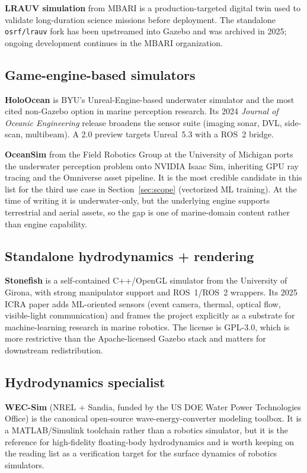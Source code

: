 \documentclass[11pt]{article}
\begin{document}
\textbf{LRAUV simulation} \autocite{player2023lrauv} from MBARI is a production-targeted digital twin used to validate long-duration science missions before deployment. The standalone \texttt{osrf/lrauv} fork has been upstreamed into Gazebo and was archived in 2025; ongoing development continues in the MBARI organization.

\subsection{Game-engine-based simulators}
\label{sec:game-engine}

\textbf{HoloOcean} \autocite{potokar2022holoocean,potokar2024holoocean} is BYU's Unreal-Engine-based underwater simulator and the most cited non-Gazebo option in marine perception research. Its 2024 \emph{Journal of Oceanic Engineering} release broadens the sensor suite (imaging sonar, DVL, side-scan, multibeam). A 2.0 preview targets Unreal~5.3 with a ROS~2 bridge.

\textbf{OceanSim} \autocite{song2025oceansim} from the Field Robotics Group at the University of Michigan ports the underwater perception problem onto NVIDIA Isaac Sim, inheriting GPU ray tracing and the Omniverse asset pipeline. It is the most credible candidate in this list for the third use case in Section~\ref{sec:scope} (vectorized ML training). At the time of writing it is underwater-only, but the underlying engine supports terrestrial and aerial assets, so the gap is one of marine-domain content rather than engine capability.

\subsection{Standalone hydrodynamics + rendering}
\textbf{Stonefish} \autocite{cieslak2019stonefish,grimaldi2025stonefish} is a self-contained C++/OpenGL simulator from the University of Girona, with strong manipulator support and ROS~1/ROS~2 wrappers. Its 2025 ICRA paper adds ML-oriented sensors (event camera, thermal, optical flow, visible-light communication) and frames the project explicitly as a substrate for machine-learning research in marine robotics. The license is GPL-3.0, which is more restrictive than the Apache-licensed Gazebo stack and matters for downstream redistribution.

\subsection{Hydrodynamics specialist}
\textbf{WEC-Sim} \autocite{ruehl2017wecsim} (NREL + Sandia, funded by the US DOE Water Power Technologies Office) is the canonical open-source wave-energy-converter modeling toolbox. It is a MATLAB/Simulink toolchain rather than a robotics simulator, but it is the reference for high-fidelity floating-body hydrodynamics and is worth keeping on the reading list as a verification target for the surface dynamics of robotics simulators.
\end{document}

